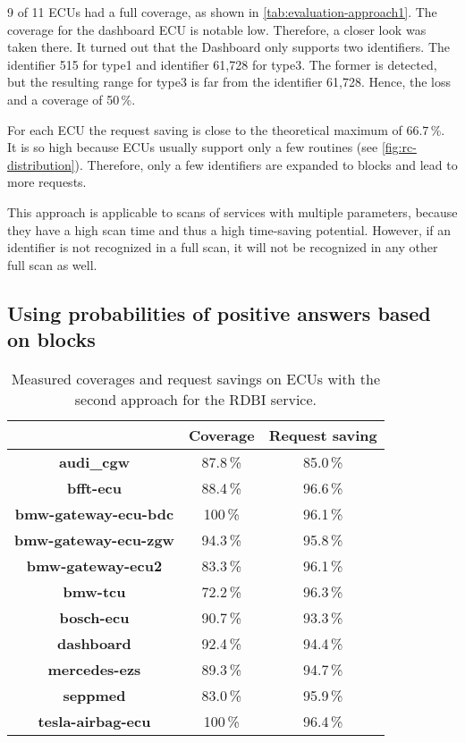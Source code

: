 9 of 11 ECUs had a full coverage, as shown in \autoref{tab:evaluation-approach1}. The coverage for the dashboard ECU is notable low. Therefore, a closer look was taken there. It turned out that the Dashboard only supports two identifiers. The identifier 515 for type1 and identifier 61,728 for type3. The former is detected, but the resulting range for type3 is far from the identifier 61,728. Hence, the loss and a coverage of 50\,\%.

For each ECU the request saving is close to the theoretical maximum of $66.7$\,\%. It is so high because ECUs usually support only a few routines (see \autoref{fig:rc-distribution}). Therefore, only a few identifiers are expanded to blocks and lead to more requests.

This approach is applicable to scans of services with multiple parameters, because they have a high scan time and thus a high time-saving potential. However, if an identifier is not recognized in a full scan, it will not be recognized in any other full scan as well.


\subsection{Using probabilities of positive answers based on blocks}

\begin{table}[H]
    \begin{center}
    \begin{tabular}{ccc}
        \hline
        & \textbf{Coverage} & \textbf{Request saving} \\
        \hline
        \textbf{audi\_cgw} & 87.8\,\% & 85.0\,\% \\
        \textbf{bfft-ecu} & 88.4\,\% & 96.6\,\% \\
        \textbf{bmw-gateway-ecu-bdc} & 100\,\% & 96.1\,\% \\
        \textbf{bmw-gateway-ecu-zgw} & 94.3\,\% & 95.8\,\% \\
        \textbf{bmw-gateway-ecu2} & 83.3\,\% & 96.1\,\% \\
        \textbf{bmw-tcu} & 72.2\,\% & 96.3\,\% \\
        \textbf{bosch-ecu} & 90.7\,\% & 93.3\,\% \\
        \textbf{dashboard} & 92.4\,\% & 94.4\,\% \\
        \textbf{mercedes-ezs} & 89.3\,\% & 94.7\,\% \\
        \textbf{seppmed} & 83.0\,\% & 95.9\,\% \\
        \textbf{tesla-airbag-ecu} & 100\,\% & 96.4\,\% \\
        \hline
    \end{tabular}
    \end{center}
    \caption{Measured coverages and request savings on ECUs with the second approach for the RDBI service.}
    \label{tab:evaluation-approach2}
\end{table}

